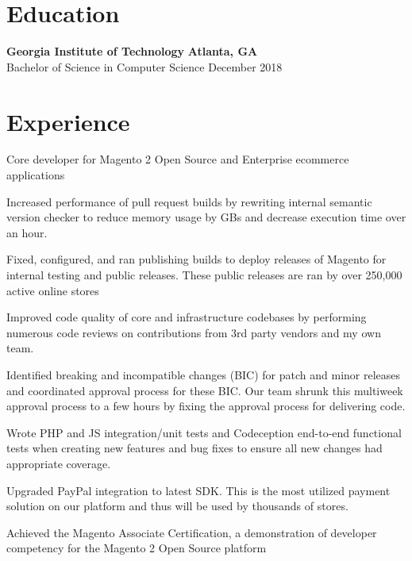 \documentclass[line]{resume}
\begin{document}
\begin{center}
\end{center}
\section{Education}
\textbf{Georgia Institute of Technology} \hfill \textbf{Atlanta, GA} \\
Bachelor of Science in Computer Science  \hfill December 2018

\vspace{-2px}
\section{Experience}
\vspace{-1px}

\begin{myitemize}
	\item Core developer for Magento 2 Open Source and Enterprise ecommerce applications
	\item Increased performance of pull request builds by rewriting internal semantic version checker to reduce memory usage by GBs and decrease execution time over an hour.
	\item Fixed, configured, and ran publishing builds to deploy releases of Magento for internal testing and public releases. These public releases are ran by over 250,000 active online stores
	\item Improved code quality of core and infrastructure codebases by performing numerous code reviews on contributions from 3rd party vendors and my own team.
	\item Identified breaking and incompatible changes (BIC) for patch and minor releases and coordinated approval process for these BIC. Our team shrunk this multiweek approval process to a few hours by fixing the approval process for delivering code.
	\item Wrote PHP and JS integration/unit tests and Codeception end-to-end functional tests when creating new features and bug fixes to ensure all new changes had appropriate coverage.
	\item Upgraded PayPal integration to latest SDK. This is the most utilized payment solution on our platform and thus will be used by thousands of stores.
	\item Achieved the Magento Associate Certification, a demonstration of developer competency for the Magento 2 Open Source platform
\end{myitemize}
\end{document}
